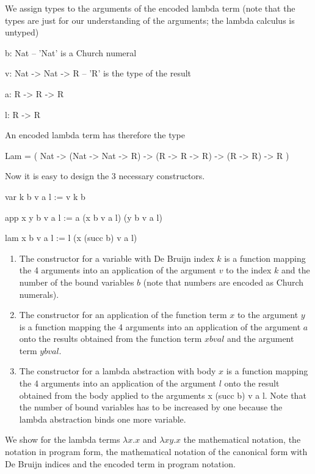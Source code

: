 \documentclass[12pt]{article}
\begin{document}
We assign types to the arguments of the encoded lambda term (note that the types
are just for our understanding of the arguments; the lambda calculus is untyped)
\begin{lam}
    b: Nat                  -- 'Nat' is a Church numeral

    v: Nat -> Nat -> R      -- 'R' is the type of the result

    a: R -> R -> R

    l: R -> R
\end{lam}
%
An encoded lambda term has therefore the type
%
\begin{lam}
    Lam = ( Nat ->
            (Nat -> Nat -> R) ->
            (R -> R -> R) ->
            (R -> R) ->
            R
          )
\end{lam}
%
%
Now it is easy to design the 3 necessary constructors.
\begin{lam}
    var k       b v a l  :=  v k b

    app x y     b v a l  :=  a (x b v a l) (y b v a l)

    lam x       b v a l  :=  l (x (succ b) v a l)
\end{lam}
%
\begin{enumerate}

    \item The constructor for a variable with De Bruijn index $k$ is a function
        mapping the 4 arguments into an application of the argument $v$ to the
        index $k$ and the number of the bound variables $b$ (note that numbers
        are encoded as Church numerals).

    \item The constructor for an application of the function term $x$ to the
        argument $y$ is a function mapping the 4 arguments into an application of
        the argument $a$ onto the results obtained from the function term $x b v
        a l$ and the argument term $y b v a l$.

    \item The constructor for a lambda abstraction with body $x$ is a function
        mapping the 4 arguments into an application of the argument $l$ onto the
        result obtained from the body applied to the arguments {x (succ b) v a
        l}. Note that the number of bound variables has to be increased by one
        because the lambda abstraction binds one more variable.
\end{enumerate}

We show for the lambda terms $\lambda x . x$ and $\lambda x y . x$ the
mathematical notation, the notation in program form, the mathematical notation
of the canonical form with De Bruijn indices and the encoded term in program
notation.
\end{document}
